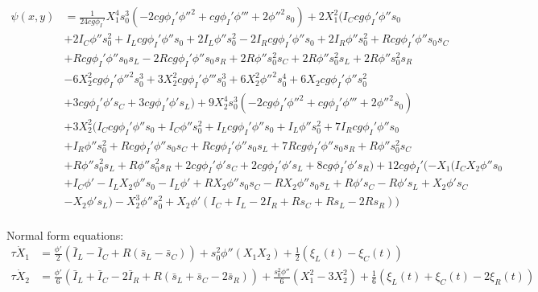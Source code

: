 \documentclass[ENG]{fancynotes}
\begin{document}
\begin{equation}
\begin{aligned}
\psi(x,y)&= \frac{1}{24 c g \phi_I'} X_{1}^{4} s_{0}^{3} (- 2 c g \phi_I' \phi''^{2} + c g \phi_I' \phi''' + 2 \phi''^{2} s_{0}) + 2 X_{1}^{2} (I_{C} c g \phi_I' \phi'' s_{0}\\
&+ 2 I_{C} \phi'' s_{0}^{2} + I_{L} c g \phi_I' \phi'' s_{0} + 2 I_{L} \phi'' s_{0}^{2} - 2 I_{R} c g \phi_I' \phi'' s_{0} + 2 I_{R} \phi'' s_{0}^{2} + R c g \phi_I' \phi'' s_{0} s_{C}  \\
&+ R c g \phi_I' \phi'' s_{0} s_{L} - 2 R c g \phi_I' \phi'' s_{0} s_{R} + 2 R \phi'' s_{0}^{2} s_{C} + 2 R \phi'' s_{0}^{2} s_{L} + 2 R \phi'' s_{0}^{2} s_{R}\\
& - 6 X_{2}^{2} c g \phi_I' \phi''^{2} s_{0}^{3} + 3 X_{2}^{2} c g \phi_I' \phi''' s_{0}^{3} + 6 X_{2}^{2} \phi''^{2} s_{0}^{4} + 6 X_{2} c g \phi_I' \phi'' s_{0}^{2}  \\
& + 3 c g \phi_I' \phi' s_{C} + 3 c g \phi_I' \phi' s_{L}) + 9 X_{2}^{4} s_{0}^{3} (- 2 c g \phi_I' \phi''^{2} + c g \phi_I' \phi''' + 2 \phi''^{2} s_{0}) \\
& + 3 X_{2}^{2} (I_{C} c g \phi_I' \phi'' s_{0} + I_{C} \phi'' s_{0}^{2} + I_{L} c g \phi_I' \phi'' s_{0} + I_{L} \phi'' s_{0}^{2} + 7 I_{R} c g \phi_I' \phi'' s_{0}  \\
& +   I_{R} \phi'' s_{0}^{2} + R c g \phi_I' \phi'' s_{0} s_{C} + R c g \phi_I' \phi'' s_{0} s_{L} + 7 R c g \phi_I' \phi'' s_{0} s_{R} + R \phi'' s_{0}^{2} s_{C} \\
& + R \phi'' s_{0}^{2} s_{L} + R \phi'' s_{0}^{2} s_{R} + 2 c g \phi_I' \phi' s_{C} + 2 c g \phi_I' \phi' s_{L} + 8 c g \phi_I' \phi' s_{R}) + 12 c g \phi_I' (- X_{1} (I_{C} X_{2} \phi'' s_{0}\\
& + I_{C} \phi' - I_{L} X_{2} \phi'' s_{0} - I_{L} \phi' + R X_{2} \phi'' s_{0} s_{C} - R X_{2} \phi'' s_{0} s_{L} + R \phi' s_{C} - R \phi' s_{L} + X_{2} \phi' s_{C}  \\
& - X_{2} \phi' s_{L}) - X_{2}^{3} \phi'' s_{0}^{2} + X_{2} \phi' (I_{C} + I_{L} - 2 I_{R} + R s_{C} + R s_{L} - 2 R s_{R}))
\\
&\end{aligned}
\end{equation}

\newpage

Normal form equations:
\begin{equation}
\begin{aligned}
\tau \dot{X}_1 &= \frac{\phi'}{2}(\bar{I}_L -  \bar{I}_C + R (\bar{s}_L - \bar{s}_C)) + s_0^2\phi''(X_1X_2) + \frac{1}{2}(\xi_L(t)-\xi_C(t)) \\[8pt]
\tau \dot{X}_2 &= \frac{\phi'}{6}(\bar{I}_L +  \bar{I}_C - 2 \bar{I}_R +  R (\bar{s}_L+ \bar{s}_C -2\bar{s}_R) ) + \frac{s_0^2\phi''}{6}(X_1^2-3X_2^2) + \frac{1}{6}(\xi_L(t)+\xi_C(t)-2\xi_R(t))
\end{aligned}
\label{eq:secondorder}
\end{equation}
\end{document}
